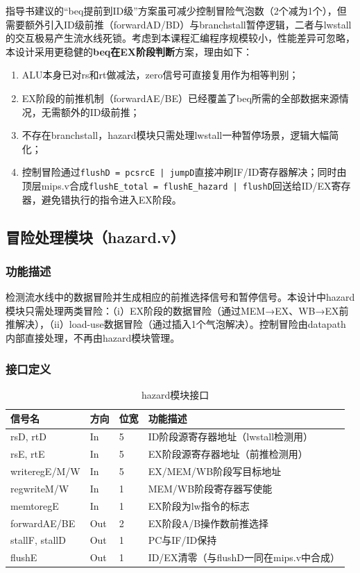 指导书建议的``beq提前到ID级''方案虽可减少控制冒险气泡数（2个减为1个），但需要额外引入ID级前推（forwardAD/BD）与branchstall暂停逻辑，二者与lwstall的交互极易产生流水线死锁。考虑到本课程汇编程序规模较小，性能差异可忽略，本设计采用更稳健的\textbf{beq在EX阶段判断}方案，理由如下：

\begin{enumerate}[(1)]
    \item ALU本身已对rs和rt做减法，zero信号可直接复用作为相等判别；
    \item EX阶段的前推机制（forwardAE/BE）已经覆盖了beq所需的全部数据来源情况，无需额外的ID级前推；
    \item 不存在branchstall，hazard模块只需处理lwstall一种暂停场景，逻辑大幅简化；
    \item 控制冒险通过\texttt{flushD = pcsrcE | jumpD}直接冲刷IF/ID寄存器解决；同时由顶层mips.v合成\texttt{flushE\_total = flushE\_hazard | flushD}回送给ID/EX寄存器，避免错执行的指令进入EX阶段。
\end{enumerate}

\subsection{冒险处理模块（hazard.v）}

\subsubsection{功能描述}

检测流水线中的数据冒险并生成相应的前推选择信号和暂停信号。本设计中hazard模块只需处理两类冒险：（i）EX阶段的数据冒险（通过MEM→EX、WB→EX前推解决），（ii）load-use数据冒险（通过插入1个气泡解决）。控制冒险由datapath内部直接处理，不再由hazard模块管理。

\subsubsection{接口定义}

\begin{table}[htp]
\caption{hazard模块接口}\label{tab:hazard}
\centering
\begin{tabular}{|l|l|l|p{6.5cm}|}
\hline
\textbf{信号名} & \textbf{方向} & \textbf{位宽} & \textbf{功能描述} \\ \hline\hline
rsD, rtD          & In  & 5 & ID阶段源寄存器地址（lwstall检测用） \\ \hline
rsE, rtE          & In  & 5 & EX阶段源寄存器地址（前推检测用） \\ \hline
writeregE/M/W     & In  & 5 & EX/MEM/WB阶段写目标地址 \\ \hline
regwriteM/W       & In  & 1 & MEM/WB阶段寄存器写使能 \\ \hline
memtoregE         & In  & 1 & EX阶段为lw指令的标志 \\ \hline
forwardAE/BE      & Out & 2 & EX阶段A/B操作数前推选择 \\ \hline
stallF, stallD    & Out & 1 & PC与IF/ID保持 \\ \hline
flushE            & Out & 1 & ID/EX清零（与flushD一同在mips.v中合成） \\ \hline
\end{tabular}
\end{table}

